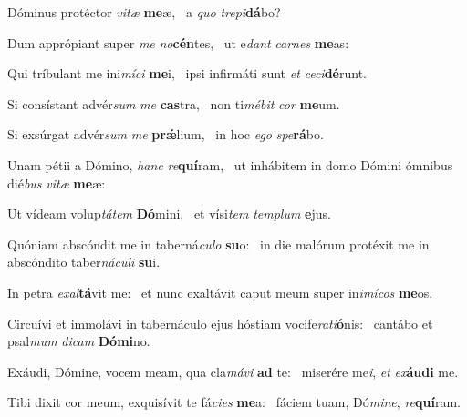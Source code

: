 \item Dóminus protéctor \textit{vi}\textit{tæ} \textbf{me}æ,~\psstar{} a \textit{quo} \textit{tre}\textit{pi}\textbf{dá}bo?

\item Dum apprópiant super \textit{me} \textit{no}\textbf{cén}tes,~\psstar{} ut e\textit{dant} \textit{car}\textit{nes} \textbf{me}as:

\item Qui tríbulant me ini\textit{mí}\textit{ci} \textbf{me}i,~\psstar{} ipsi infirmáti sunt \textit{et} \textit{ce}\textit{ci}\textbf{dé}runt.

\item Si consístant advér\textit{sum} \textit{me} \textbf{cas}tra,~\psstar{} non ti\textit{mé}\textit{bit} \textit{cor} \textbf{me}um.

\item Si exsúrgat advér\textit{sum} \textit{me} \textbf{prǽ}lium,~\psstar{} in hoc \textit{e}\textit{go} \textit{spe}\textbf{rá}bo.

\item Unam pétii a Dómino, \textit{hanc} \textit{re}\textbf{quí}ram,~\psstar{} ut inhábitem in domo Dómini ómnibus dié\textit{bus} \textit{vi}\textit{tæ} \textbf{me}æ:

\item Ut vídeam volup\textit{tá}\textit{tem} \textbf{Dó}mini,~\psstar{} et vísi\textit{tem} \textit{tem}\textit{plum} \textbf{e}jus.

\item Quóniam abscóndit me in taberná\textit{cu}\textit{lo} \textbf{su}o:~\psstar{} in die malórum protéxit me in abscóndito taber\textit{ná}\textit{cu}\textit{li} \textbf{su}i.

\item In petra \textit{ex}\textit{al}\textbf{tá}vit me:~\psstar{} et nunc exaltávit caput meum super in\textit{i}\textit{mí}\textit{cos} \textbf{me}os.

\item Circuívi et immolávi in tabernáculo ejus hóstiam vocife\textit{ra}\textit{ti}\textbf{ó}nis:~\psstar{} cantábo et psal\textit{mum} \textit{di}\textit{cam} \textbf{Dó}\textbf{mi}no.

\item Exáudi, Dómine, vocem meam, qua cla\textit{má}\textit{vi} \textbf{ad} te:~\psstar{} miserére me\textit{i}, \textit{et} \textit{ex}\textbf{áu}\textbf{di} me.

\item Tibi dixit cor meum, exquisívit te fá\textit{ci}\textit{es} \textbf{me}a:~\psstar{} fáciem tuam, Dó\textit{mi}\textit{ne}, \textit{re}\textbf{quí}ram.

